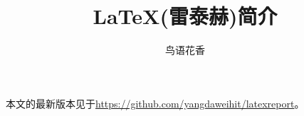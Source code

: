\documentclass{hitec}
\title{\LaTeX{}(雷泰赫)简介}
\author{鸟语花香}
\begin{document}
\maketitle

本文的最新版本见于\url{https://github.com/yangdaweihit/latexreport}。

\linenumbers









\end{document}
